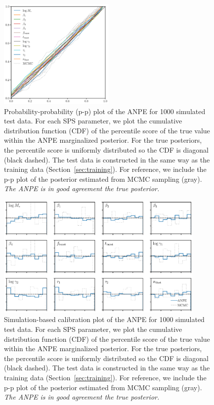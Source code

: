 \begin{figure}
\begin{center}
    \includegraphics[width=0.5\textwidth]{figs/ppplot.pdf}
    \caption{\label{fig:pp}
    Probability-probability (p-p) plot of the ANPE for 1000 simulated test data. 
    For each SPS parameter, we plot the cumulative distribution function (CDF) of the
    percentile score of the true value within the ANPE marginalized posterior.
    For the true posteriors, the percentile score is uniformly distributed so
    the CDF is diagonal (black dashed).
    The test data is constructed in the same way as the training data
    (Section~\ref{sec:training}). 
    For reference, we include the p-p plot of the posterior estimated from MCMC
    sampling (gray). 
    \emph{The ANPE is in good agreement the true posterior.}
    }
\end{center}
\end{figure}

\begin{figure}
\begin{center}
    \includegraphics[width=0.9\textwidth]{figs/sbc.pdf}
    \caption{\label{fig:pp}
    Simulation-based calibration plot of the ANPE for 1000 simulated test data. 
    For each SPS parameter, we plot the cumulative distribution function (CDF) of the
    percentile score of the true value within the ANPE marginalized posterior.
    For the true posteriors, the percentile score is uniformly distributed so
    the CDF is diagonal (black dashed).
    The test data is constructed in the same way as the training data
    (Section~\ref{sec:training}). 
    For reference, we include the p-p plot of the posterior estimated from MCMC
    sampling (gray). 
    \emph{The ANPE is in good agreement the true posterior.}
    }
\end{center}
\end{figure}

